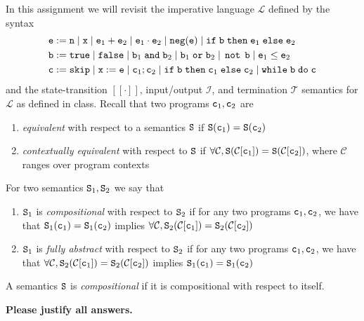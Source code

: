 \documentclass{article}
\begin{document}
\noindent In this assignment we will revisit the imperative language $\mathcal{L}$ defined by the syntax
\begin{align*}
& \mathtt{e} := \mathtt{n} \; | \; \mathtt{x} \; | \; \mathtt{e}_1 + \mathtt{e}_2 \; | \; \mathtt{e}_1 \cdot \mathtt{e}_2 \; | \; \mathtt{neg}(\mathtt{e}) \; | \; \mathtt{if} \; \mathtt{b} \; \mathtt{then} \; \mathtt{e}_1 \; \mathtt{else} \; \mathtt{e}_2 \\ 
& \mathtt{b} := \mathtt{true} \; | \; \mathtt{false} \; | \; \mathtt{b}_1 \; \mathtt{and} \; \mathtt{b}_2 \; | \; \mathtt{b}_1 \; \mathtt{or} \; \mathtt{b}_2 \; | \; \mathop{\mathtt{not}} \; \mathtt{b} \; | \; \mathtt{e}_1 \leq \mathtt{e}_2 \\
& \mathtt{c} := \mathtt{skip} \; | \; \mathtt{x} := \mathtt{e} \; | \; \mathtt{c}_1 ; \mathtt{c}_2 \; | \; \mathtt{if} \; \mathtt{b} \; \mathtt{then} \; \mathtt{c}_1 \; \mathtt{else} \; \mathtt{c}_2 \; | \; \mathtt{while} \; \mathtt{b} \; \mathtt{do} \; \mathtt{c}
\end{align*}
and the state-transition $[[\cdot]]$, input/output $\mathcal{I}$, and termination $\mathcal{T}$ semantics for $\mathcal{L}$ as defined in class. Recall that two programs $\mathtt{c}_1, \mathtt{c}_2$ are 
\begin{enumerate}
\item \emph{equivalent} with respect to a semantics $\mathtt{S}$ if $\mathtt{S}(\mathtt{c}_1) = \mathtt{S}(\mathtt{c}_2)$
\item \emph{contextually equivalent} with respect to $\mathtt{S}$ if $\forall \mathcal{C}, \mathtt{S}(\mathcal{C}[\mathtt{c}_1]) = \mathtt{S}(\mathcal{C}[\mathtt{c}_2])$, where $\mathcal{C}$ ranges over program contexts
\end{enumerate}
For two semantics $\mathtt{S}_1, \mathtt{S}_2$ we say that
\begin{enumerate}
	\item $\mathtt{S}_1$ is \emph{compositional} with respect to $\mathtt{S}_2$ if for any two programs $\mathtt{c}_1,\mathtt{c}_2$, we have that $\mathtt{S}_1(\mathtt{c}_1) = \mathtt{S}_1(\mathtt{c}_2)$ implies $\forall \mathcal{C}, \mathtt{S}_2(\mathcal{C}[\mathtt{c}_1]) = \mathtt{S}_2(\mathcal{C}[\mathtt{c}_2])$
	\item $\mathtt{S}_1$ is \emph{fully abstract} with respect to $\mathtt{S}_2$ if for any two programs $\mathtt{c}_1,\mathtt{c}_2$, we have that $\forall \mathcal{C}, \mathtt{S}_2(\mathcal{C}[\mathtt{c}_1]) = \mathtt{S}_2(\mathcal{C}[\mathtt{c}_2])$ implies $\mathtt{S}_1(\mathtt{c}_1) = \mathtt{S}_1(\mathtt{c}_2)$
	\end{enumerate}
	A semantics $\mathtt{S}$ is \emph{compositional} if it is compositional with respect to itself.\bigskip

\noindent \textbf{Please justify all answers.}
\end{document}
